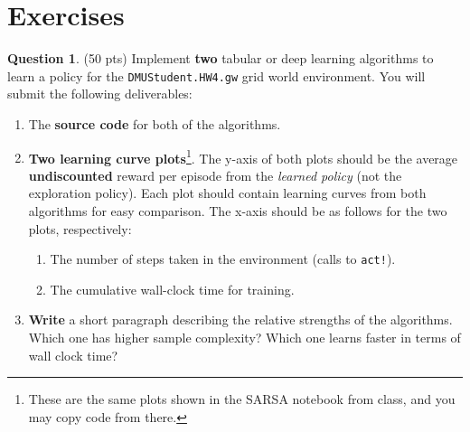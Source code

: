 \documentclass{article}
\theoremstyle{definition}
\newtheorem{question}[thm]{Question}
\begin{document}
\section{Exercises}

\begin{question}
    (50 pts) Implement \textbf{two} tabular or deep learning algorithms to learn a policy for the \texttt{DMUStudent.HW4.gw} grid world environment.     You will submit the following deliverables:

    \begin{enumerate}[label=\alph*)]
        \item The \textbf{source code} for both of the algorithms.
        \item \textbf{Two learning curve plots}\footnote{These are the same plots shown in the SARSA notebook from class, and you may copy code from there.}.  The y-axis of both plots should be the average \textbf{undiscounted} reward per episode from the \emph{learned policy} (not the exploration policy). Each plot should contain learning curves from both algorithms for easy comparison. The x-axis should be as follows for the two plots, respectively:
            \begin{enumerate}[label=\arabic*)]
                \item The number of steps taken in the environment (calls to \texttt{act!}).
                \item The cumulative wall-clock time for training.
            \end{enumerate}
        \item \textbf{Write} a short paragraph describing the relative strengths of the algorithms. Which one has higher sample complexity? Which one learns faster in terms of wall clock time?
    \end{enumerate}
\end{question}
\end{document}
